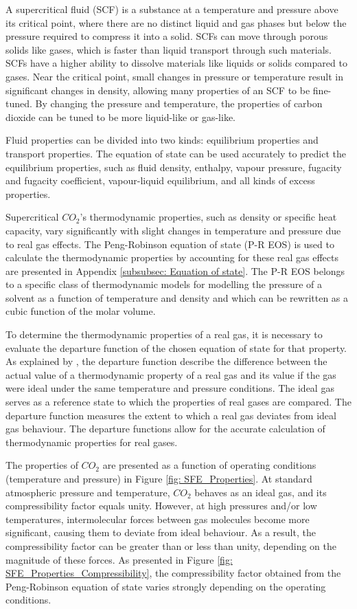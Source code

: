 \documentclass[../Article_Model_Parameters.tex]{subfiles}
\begin{document}
	
	A supercritical fluid (SCF) is a substance at a temperature and pressure above its critical point, where there are no distinct liquid and gas phases but below the pressure required to compress it into a solid. SCFs can move through porous solids like gases, which is faster than liquid transport through such materials. SCFs have a higher ability to dissolve materials like liquids or solids compared to gases. Near the critical point, small changes in pressure or temperature result in significant changes in density, allowing many properties of an SCF to be fine-tuned. By changing the pressure and temperature, the properties of carbon dioxide can be tuned to be more liquid-like or gas-like.

	Fluid properties can be divided into two kinds: equilibrium properties and transport properties. The equation of state can be used accurately to predict the equilibrium properties, such as fluid density, enthalpy, vapour pressure, fugacity and fugacity coefficient, vapour-liquid equilibrium, and all kinds of excess properties.
	
	Supercritical $CO_2$'s thermodynamic properties, such as density or specific heat capacity, vary significantly with slight changes in temperature and pressure due to real gas effects. The Peng-Robinson equation of state (P-R EOS) is used to calculate the thermodynamic properties by accounting for these real gas effects are presented in Appendix \ref{subsubsec: Equation of state}. The P-R EOS belongs to a specific class of thermodynamic models for modelling the pressure of a solvent as a function of temperature and density and which can be rewritten as a cubic function of the molar volume.
	
	To determine the thermodynamic properties of a real gas, it is necessary to evaluate the departure function of the chosen equation of state for that property. As explained by \citet{Elliott2011}, the departure function describe the difference between the actual value of a thermodynamic property of a real gas and its value if the gas were ideal under the same temperature and pressure conditions. The ideal gas serves as a reference state to which the properties of real gases are compared. The departure function measures the extent to which a real gas deviates from ideal gas behaviour. The departure functions allow for the accurate calculation of thermodynamic properties for real gases. %
	
	The properties of $CO_2$ are presented as a function of operating conditions (temperature and pressure) in Figure \ref{fig: SFE_Properties}. At standard atmospheric pressure and temperature, $CO_2$  behaves as an ideal gas, and its compressibility factor equals unity. However, at high pressures and/or low temperatures, intermolecular forces between gas molecules become more significant, causing them to deviate from ideal behaviour. As a result, the compressibility factor can be greater than or less than unity, depending on the magnitude of these forces. As presented in Figure \ref{fig: SFE_Properties_Compressibility}, the compressibility factor obtained from the Peng-Robinson equation of state varies strongly depending on the operating conditions. 
	
\end{document}
